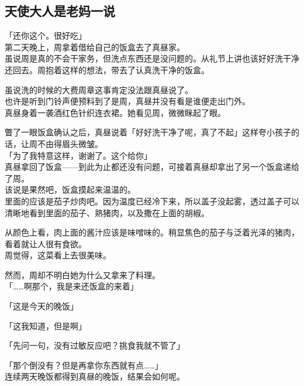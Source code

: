 \subsection{天使大人是老妈一说}

「还你这个。很好吃」\\

第二天晚上，周拿着借给自己的饭盒去了真昼家。\\

虽说周是真的不会干家务，但洗点东西还是没问题的。从礼节上讲也该好好洗干净还回去。周抱着这样的想法，带去了认真洗干净的饭盒。

虽说洗的时候的大费周章这事肯定没法跟真昼说了。\\

也许是听到门铃声便预料到了是周，真昼并没有看是谁便走出门外。\\

真昼身着一袭酒红色针织连衣裙。她看见周，微微眯起了眼。

瞥了一眼饭盒确认之后，真昼说着「好好洗干净了呢，真了不起」这样夸小孩子的话，让周不由得眉头微皱。\\

「为了我特意这样，谢谢了。这个给你」\\

真昼拿回了饭盒——到此为止都还没有问题，可接着真昼却拿出了另一个饭盒递给了周。\\

该说是果然吧，饭盒摸起来温温的。\\

里面的应该是茄子炒肉吧。因为温度已经冷下来，所以盖子没起雾，透过盖子可以清晰地看到里面的茄子、熟猪肉，以及撒在上面的胡椒。

从颜色上看，肉上面的酱汁应该是味噌味的。稍显焦色的茄子与泛着光泽的猪肉，看着就让人很有食欲。\\

周觉得，这菜看上去很美味。

然而，周却不明白她为什么又拿来了料理。\\

「……啊那个，我是来还饭盒的来着」

「这是今天的晚饭」

「这我知道，但是啊」

「先问一句，没有过敏反应吧？挑食我就不管了」

「那个倒没有？但是再拿你东西就有点……」\\

连续两天晚饭都得到真昼的晚饭，结果会如何呢。\\


